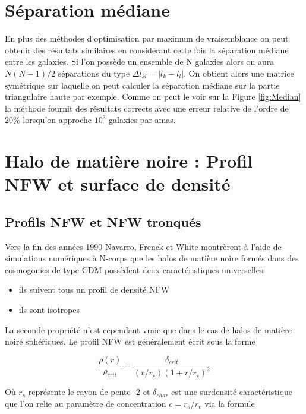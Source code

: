 \documentclass[a4paper,11pt]{article}
\numberwithin{equation}{section}
\begin{document}
\begin{multicols}{2}
  \section{Séparation médiane}
    En plus des méthodes d'optimisation par maximum de vraisemblance on peut obtenir des résultats similaires en considérant cette fois la séparation médiane entre les galaxies.\newline
    Si l'on possède un ensemble de N galaxies alors on aura $N(N-1)/2$ séparations du type $\Delta l_{kl} = \vert l_k - l_l \vert$. On obtient alors une matrice symétrique sur laquelle on peut calculer la séparation médiane sur la partie triangulaire haute par exemple.\newline
Comme on peut le voir sur la Figure \ref{fig:Median} la méthode fournit des résultats corrects avec une erreur relative de l'ordre de $20\%$ lorsqu'on approche $10^3$ galaxies par amas.
  \newpage
  
  \section{Halo de matière noire : Profil NFW et surface de densité}
  \subsection{Profils NFW et NFW tronqués}
    Vers la fin des années 1990 Navarro, Frenck et White montrèrent à l'aide de simulations numériques à N-corps que les halos de matière noire formés dans des cosmogonies de type CDM possèdent deux caractéristiques universelles:
    
    \begin{itemize}
      \item ils suivent tous un profil de densité NFW
      \item ils sont isotropes
    \end{itemize}

    La seconde propriété n'est cependant vraie que dans le cas de halos de matière noire sphériques. Le profil NFW est généralement écrit sous la forme\cite{NFW1996}
    
    \begin{equation}
      \label{NFW_profile}
      \frac{\rho(r)}{\rho_{crit}} = \frac{\delta_{crit}}{(r/r_s) ( 1 + r / r_s)^2}
    \end{equation}
    
    Où $r_s$ représente le rayon de pente -2 et $\delta_{char}$ est une surdensité caractéristique que l'on relie au paramètre de concentration $c = r_s / r_v$ via la formule\cite{Mo_concentration}
    

\end{multicols}
\end{document}
